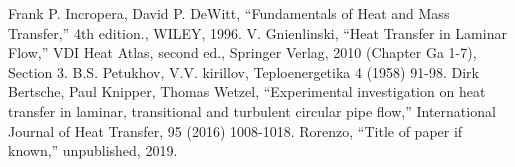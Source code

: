 \documentclass[conference]{IEEEtran}
\begin{document}


\begin{thebibliography}{00}
  Frank P. Incropera, David P. DeWitt, ``Fundamentals of Heat and Mass Transfer,'' 4th edition., WILEY, 1996.
  V. Gnienlinski, ``Heat Transfer in Laminar Flow,'' VDI Heat Atlas, second ed., Springer Verlag, 2010 (Chapter Ga 1-7), Section 3.
  B.S. Petukhov, V.V. kirillov, Teploenergetika 4 (1958) 91-98.
  Dirk Bertsche, Paul Knipper, Thomas Wetzel, ``Experimental investigation on heat transfer in laminar, transitional and turbulent circular pipe flow,'' International Journal of Heat Transfer, 95 (2016) 1008-1018.
 Rorenzo, ``Title of paper if known,'' unpublished, 2019.

%
%

\end{thebibliography}
\end{document}
